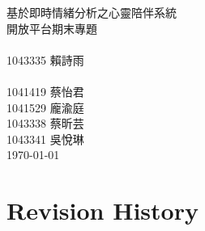 \documentclass[12pt]{scrreprt}
\date{}
\def\myversion{1.0 }
\begin{document}
\renewcommand{\tablename}{表} %
\renewcommand{\figurename}{圖} %
\CJKindent
\begin{center}
    \begin{bfseries}
        \Huge{基於即時情緒分析之心靈陪伴系統}\\
         \vspace{2cm}
		開放平台期末專題\\
	 \vspace{2cm}
         {\\}
		{\huge1043335 賴詩雨\\}
	\vspace{1cm}
         {\\}
		{\huge1041419 蔡怡君\\
		1041529 龐渝庭\\
		1043338 蔡昕芸\\
		1043341 吳悅琳\\}
	\vspace{2cm}
		{\huge\today\\}
    \end{bfseries}
\end{center}

\tableofcontents


\chapter*{Revision History}
\end{document}
